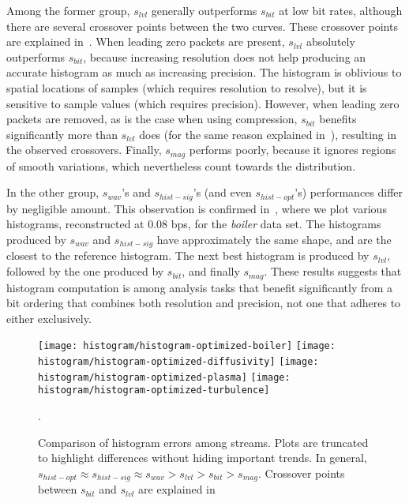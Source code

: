 Among the former group, $s_{lvl}$ generally outperforms $s_{bit}$ at low bit rates, although there
are several crossover points between the two curves. These crossover points are explained
in~. When leading zero packets are present, $s_{lvl}$ absolutely
outperforms $s_{bit}$, because increasing resolution does not help producing an accurate histogram
as much as increasing precision. The histogram is oblivious to spatial locations of samples (which
requires resolution to resolve), but it is sensitive to sample values (which requires precision).
However, when leading zero packets are removed, as is the case when using compression, $s_{bit}$
benefits significantly more than $s_{lvl}$ does (for the same reason explained in~),
resulting in the observed crossovers. Finally, $s_{mag}$ performs
poorly, because it ignores regions of smooth variations, which nevertheless count towards the
distribution.

In the other group, $s_{wav}$'s and $s_{hist-sig}$'s (and even $s_{hist-opt}$'s) performances
differ by negligible amount. This observation is confirmed in~, where
we plot various histograms, reconstructed at 0.08 bps, for the \emph{boiler} data set. The histograms
produced by $s_{wav}$ and $s_{hist-sig}$ have approximately the same shape, and are the closest to
the reference histogram. The next best histogram is produced by $s_{lvl}$, followed by the one
produced by $s_{bit}$, and finally $s_{mag}$. These results suggests that histogram computation is
among analysis tasks that benefit significantly from a bit ordering that combines both resolution
and precision, not one that adheres to either exclusively.

\begin{figure}[t]
	\centering
	{\texttt{[image: histogram/histogram-optimized-boiler]}}
	{\texttt{[image: histogram/histogram-optimized-diffusivity]}}
	{\texttt{[image: histogram/histogram-optimized-plasma]}}
	{\texttt{[image: histogram/histogram-optimized-turbulence]}}
	\caption{Comparison of histogram errors among streams. Plots are truncated to highlight
	differences without hiding important trends. In general, $s_{hist-opt}\approx s_{hist-sig}\approx
	s_{wav} > s_{lvl} > s_{bit} > s_{mag}$. Crossover points between $s_{bit}$ and $s_{lvl}$ are
	explained in~}.
	\label{fig:histogram-stream-comparison}
\end{figure}


